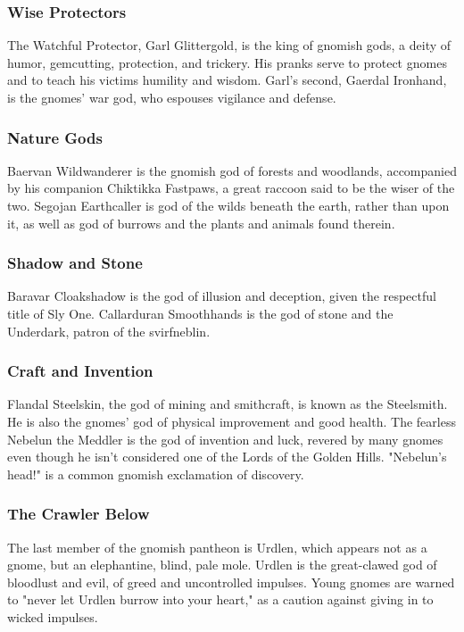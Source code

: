 \documentclass[10pt,a4paper,twoside,twocolumn,openany,bg=print,nodeprecatedcode]{dndbook}
\begin{document}
\subsubsection{Wise Protectors}
The Watchful Protector, Garl Glittergold, is the king of gnomish gods, a deity of humor, gemcutting, protection, and trickery. His pranks serve to protect gnomes and to teach his victims humility and wisdom. Garl's second, Gaerdal Ironhand, is the gnomes' war god, who espouses vigilance and defense.
\subsubsection{Nature Gods}
Baervan Wildwanderer is the gnomish god of forests and woodlands, accompanied by his companion Chiktikka Fastpaws, a great raccoon said to be the wiser of the two. Segojan Earthcaller is god of the wilds beneath the earth, rather than upon it, as well as god of burrows and the plants and animals found therein.
\subsubsection{Shadow and Stone}
Baravar Cloakshadow is the god of illusion and deception, given the respectful title of Sly One. Callarduran Smoothhands is the god of stone and the Underdark, patron of the svirfneblin.
\subsubsection{Craft and Invention}
Flandal Steelskin, the god of mining and smithcraft, is known as the Steelsmith. He is also the gnomes' god of physical improvement and good health. The fearless Nebelun the Meddler is the god of invention and luck, revered by many gnomes even though he isn't considered one of the Lords of the Golden Hills. "Nebelun's head!" is a common gnomish exclamation of discovery.
\subsubsection{The Crawler Below}
The last member of the gnomish pantheon is Urdlen, which appears not as a gnome, but an elephantine, blind, pale mole. Urdlen is the great-clawed god of bloodlust and evil, of greed and uncontrolled impulses. Young gnomes are warned to "never let Urdlen burrow into your heart," as a caution against giving in to wicked impulses.
\end{document}
